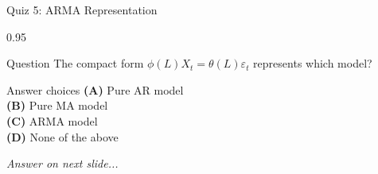 \documentclass[9pt, aspectratio=169, t]{beamer}
\begin{document}
\begin{frame}{Quiz 5: ARMA Representation}
    \begin{cminipage}{0.95\textwidth}
    \begin{alertblock}{Question}
        The compact form $\phi(L)X_t = \theta(L)\varepsilon_t$ represents which model?
    \end{alertblock}

    \vspace{0.4cm}

    \begin{block}{Answer choices}
        \textcolor{MainBlue}{\textbf{(A)}} Pure AR model\\[3pt]
        \textcolor{MainBlue}{\textbf{(B)}} Pure MA model\\[3pt]
        \textcolor{MainBlue}{\textbf{(C)}} ARMA model\\[3pt]
        \textcolor{MainBlue}{\textbf{(D)}} None of the above
    \end{block}

    \vspace{0.5cm}

    \begin{center}
        \textit{Answer on next slide...}
    \end{center}
    \end{cminipage}
\end{frame}
\end{document}
